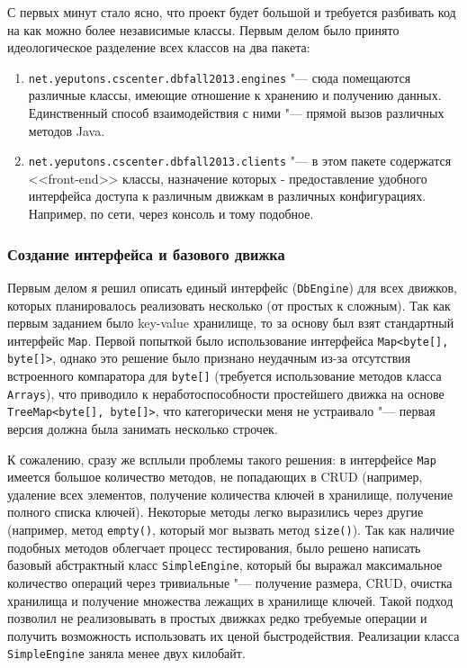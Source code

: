 \documentclass[a4paper]{article}
\renewcommand{\t}{\texttt}
\begin{document}
  С первых минут стало ясно, что проект будет большой и требуется разбивать код на как можно более
  независимые классы. Первым делом было принято идеологическое разделение всех классов на два пакета:
  \begin{enumerate}
  \item \t{net.yeputons.cscenter.dbfall2013.engines} "--- сюда помещаются различные классы, имеющие
        отношение к хранению и получению данных. Единственный способ взаимодействия с ними "--- прямой
        вызов различных методов Java.
  \item \t{net.yeputons.cscenter.dbfall2013.clients} "--- в этом пакете содержатся <<front-end>> классы,
        назначение которых - предоставление удобного интерфейса доступа к различным движкам в различных
        конфигурациях. Например, по сети, через консоль и тому подобное.
  \end{enumerate}

\subsubsection{Создание интерфейса и базового движка}
  Первым делом я решил описать единый интерфейс (\t{DbEngine}) для всех движков, которых планировалось реализовать несколько
  (от простых к сложным). Так как первым заданием было key-value хранилище, то за основу был взят стандартный
  интерфейс \t{Map}. Первой попыткой было использование интерфейса \t{Map<byte[], byte[]>}, однако
  это решение было признано неудачным из-за отсутствия встроенного компаратора для \t{byte[]} (требуется
  использование методов класса \t{Arrays}), что приводило к неработоспособности простейшего движка
  на основе \t{TreeMap<byte[], byte[]>}, что категорически меня не устраивало "--- первая версия должна была
  занимать несколько строчек.

  К сожалению, сразу же всплыли проблемы такого решения: в интерфейсе \t{Map} имеется большое количество
  методов, не попадающих в CRUD (например, удаление всех элементов, получение количества ключей в хранилище,
  получение полного списка ключей). Некоторые методы легко выразились через другие (например, метод
  \t{empty()}, который мог вызвать метод \t{size()}). Так как наличие подобных методов облегчает
  процесс тестирования, было решено написать базовый абстрактный класс \t{SimpleEngine}, который
  бы выражал максимальное количество операций через тривиальные "--- получение размера, CRUD, очистка
  хранилища и получение множества лежащих в хранилище ключей. Такой подход позволил не реализовывать
  в простых движках редко требуемые операции и получить возможность использовать их ценой быстродействия.
  Реализации класса \t{SimpleEngine} заняла менее двух килобайт.
\end{document}
